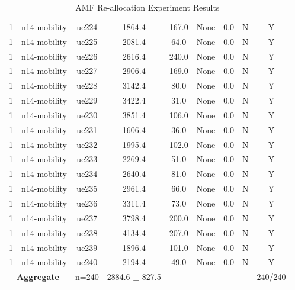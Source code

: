 \begin{table}[ht]
\begin{tabular}{|c|c|c|c|c|c|c|c|c|}
1 & n14-mobility & ue224 & 1864.4 & 167.0 & None & 0.0 & N & Y \\
1 & n14-mobility & ue225 & 2081.4 & 64.0 & None & 0.0 & N & Y \\
1 & n14-mobility & ue226 & 2616.4 & 240.0 & None & 0.0 & N & Y \\
1 & n14-mobility & ue227 & 2906.4 & 169.0 & None & 0.0 & N & Y \\
1 & n14-mobility & ue228 & 3142.4 & 80.0 & None & 0.0 & N & Y \\
1 & n14-mobility & ue229 & 3422.4 & 31.0 & None & 0.0 & N & Y \\
1 & n14-mobility & ue230 & 3851.4 & 106.0 & None & 0.0 & N & Y \\
1 & n14-mobility & ue231 & 1606.4 & 36.0 & None & 0.0 & N & Y \\
1 & n14-mobility & ue232 & 1995.4 & 102.0 & None & 0.0 & N & Y \\
1 & n14-mobility & ue233 & 2269.4 & 51.0 & None & 0.0 & N & Y \\
1 & n14-mobility & ue234 & 2640.4 & 81.0 & None & 0.0 & N & Y \\
1 & n14-mobility & ue235 & 2961.4 & 66.0 & None & 0.0 & N & Y \\
1 & n14-mobility & ue236 & 3311.4 & 73.0 & None & 0.0 & N & Y \\
1 & n14-mobility & ue237 & 3798.4 & 200.0 & None & 0.0 & N & Y \\
1 & n14-mobility & ue238 & 4134.4 & 207.0 & None & 0.0 & N & Y \\
1 & n14-mobility & ue239 & 1896.4 & 101.0 & None & 0.0 & N & Y \\
1 & n14-mobility & ue240 & 2194.4 & 49.0 & None & 0.0 & N & Y \\
\multicolumn{2}{|c|}{\textbf{Aggregate}} & n=240 & 2884.6 $\pm$ 827.5 & -- & -- & -- & -- & 240/240 \\
\hline
\end{tabular}
\caption{AMF Re-allocation Experiment Results}
\label{tab:amf_realloc}
\end{table}
